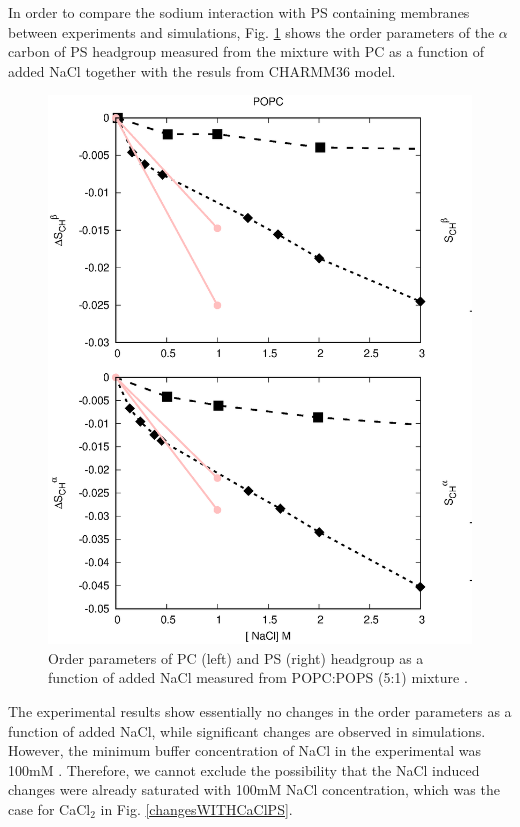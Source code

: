 \documentclass[aps,prl,superscriptaddress,twocolumn]{revtex4}
\begin{document}
In order to compare the sodium interaction with PS containing membranes between
experiments and simulations, Fig. \ref{PSresponseTONaCl} shows the order parameters of the
$\alpha$ carbon of PS headgroup measured from the mixture with PC as a
function of added NaCl \cite{roux86} together with the resuls from CHARMM36 model. 
\begin{figure}[]
  \centering
  \includegraphics[width=18.0cm]{../Figs/CHANGESwithMONVALENTwithPS.eps}
  \caption{\label{PSresponseTONaCl}
    Order parameters of PC (left) and PS (right) headgroup as a function of added NaCl measured from POPC:POPS (5:1) mixture \cite{roux90}.
  }
\end{figure}
The experimental results show essentially no changes in the order parameters as a function of
added NaCl, while significant changes are observed in simulations. However,
the minimum buffer concentration of NaCl in the experimental was 100mM \cite{roux86}.
Therefore, we cannot exclude the possibility that the NaCl induced changes were already
saturated with 100mM NaCl concentration, which was the case for CaCl$_2$ in Fig. \ref{changesWITHCaClPS}.
\end{document}
